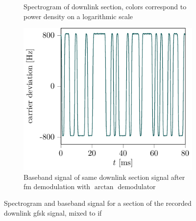 \begin{figure}[h]
\begin{subfigure}[t]{0.425\textwidth}
	\vskip 0pt
	\centering

	\vspace{0.1cm}
	\caption{Spectrogram of downlink section, colors correspond to power density on a logarithmic scale}
	\label{fig:downlink_spectrogram}
\end{subfigure}
\hspace{0.03\textwidth}
\begin{subfigure}[t]{0.475\textwidth}
	\vspace{0cm}
	\centering
	\includegraphics[width=\textwidth]{fig/downlink_baseband.pdf}
	\vspace{-0.18cm}
	\caption{Baseband signal of same downlink section signal after \gls{fm} demodulation with $\arctan$ demodulator}
	\label{fig:downlink_baseband}
\end{subfigure}
\caption{Spectrogram and baseband signal for a section of the recorded downlink \gls{gfsk} signal, mixed to \gls{if}}
\label{fig:downlink_spectrogram_baseband}
\end{figure}

